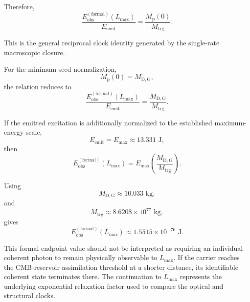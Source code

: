 Therefore,
\begin{equation}
    \frac{
        E_{\mathrm{obs}}^{(\mathrm{formal})}(L_{\mathrm{max}})
    }{
        E_{\mathrm{emit}}
    }
    =
    \frac{
        M_{\mathrm{p}}(0)
    }{
        M_{\mathrm{trg}}
    }.
\end{equation}

This is the general reciprocal clock identity generated by the single-rate macroscopic closure.

For the minimum-seed normalization,
\begin{equation}
    M_{\mathrm{p}}(0)
    =
    M_{\mathrm{D,G}},
\end{equation}
the relation reduces to
\begin{equation}
    \frac{
        E_{\mathrm{obs}}^{(\mathrm{formal})}(L_{\mathrm{max}})
    }{
        E_{\mathrm{emit}}
    }
    =
    \frac{
        M_{\mathrm{D,G}}
    }{
        M_{\mathrm{trg}}
    }.
\end{equation}

If the emitted excitation is additionally normalized to the established maximum-energy scale,
\begin{equation}
    E_{\mathrm{emit}}
    =
    E_{\mathrm{max}}
    \approx
    13.331
    \text{ J},
\end{equation}
then
\begin{equation}
    E_{\mathrm{obs}}^{(\mathrm{formal})}(L_{\mathrm{max}})
    =
    E_{\mathrm{max}}
    \left(
        \frac{
            M_{\mathrm{D,G}}
        }{
            M_{\mathrm{trg}}
        }
    \right).
\end{equation}

Using
\begin{equation}
    M_{\mathrm{D,G}}
    \approx
    10.033
    \text{ kg},
\end{equation}
and
\begin{equation}
    M_{\mathrm{trg}}
    \approx
    8.6208\times10^{77}
    \text{ kg},
\end{equation}
gives
\begin{equation}
    E_{\mathrm{obs}}^{(\mathrm{formal})}(L_{\mathrm{max}})
    \approx
    1.5515\times10^{-76}
    \text{ J}.
\end{equation}

This formal endpoint value should not be interpreted as requiring an individual coherent photon to remain physically observable to $L_{\mathrm{max}}$. If the carrier reaches the CMB-reservoir assimilation threshold at a shorter distance, its identifiable coherent state terminates there. The continuation to $L_{\mathrm{max}}$ represents the underlying exponential relaxation factor used to compare the optical and structural clocks.

